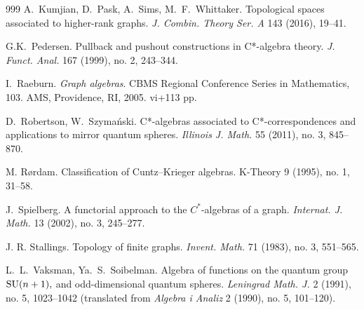 \documentclass[12pt,times,a4paper]{amsart}
\numberwithin{equation}{section}
\numberwithin{equation}{section}
\begin{document}
\begin{thebibliography}{999}
A.~Kumjian, D.~Pask, A.~Sims, M.~F.~Whittaker. 
Topological spaces associated to higher-rank graphs. 
{\em J. Combin. Theory Ser. A} 143 (2016), 19--41.

G.K.~Pedersen. 
Pullback and pushout constructions in C*-algebra theory. 
{\em J. Funct. Anal.} 167 (1999), no. 2, 243--344.

I.~Raeburn. 
{\em Graph algebras}. 
CBMS Regional Conference Series in Mathematics, 103. AMS, Providence, RI, 2005. vi+113 pp.

D.~Robertson, W.~Szyma\'nski. 
C*-algebras associated to C*-correspondences and applications to mirror quantum spheres. 
{\em Illinois J. Math.} 55 (2011), no. 3, 845--870.

M. R\o rdam.
Classification of Cuntz--Krieger algebras.
{K-Theory} 9 (1995), no. 1, 31--58.

J.~Spielberg. 
A functorial approach to the $C^*$-algebras of a graph. 
{\em Internat. J. Math.} 13 (2002), no. 3, 245--277.

J. R. Stallings.
Topology of finite graphs. 
{\em Invent. Math.} 71 (1983), no. 3, 551--565.

L.~L.~Vaksman, Ya.~S.~Soibelman. 
Algebra of functions on the quantum group ${\rm SU}(n+1),$ and odd-dimensional quantum spheres. 
{\em Leningrad Math. J.} 2 (1991), no. 5, 1023--1042 (translated from {\em Algebra i Analiz} 2 (1990), no. 5, 101--120).

\end{thebibliography}
\end{document}
